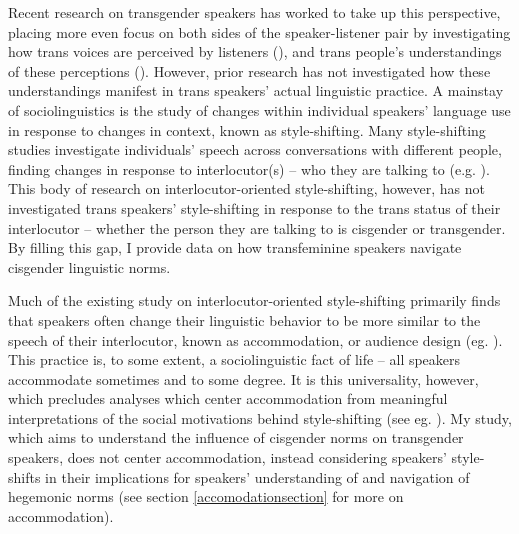 \documentclass[12pt,twoside]{reedthesis}
\begin{document}
Recent research on transgender speakers has worked to take up this perspective, placing more even focus on both sides of the speaker-listener pair by investigating how trans voices are perceived by listeners (\cite{jessee_cisgender_2025}), and trans people's understandings of these perceptions (\cite{heffernan_constructing_2023}). However, prior research has not investigated how these understandings manifest in trans speakers' actual linguistic practice. A mainstay of sociolinguistics is the study of changes within individual speakers' language use in response to changes in context, known as style-shifting. Many style-shifting studies investigate individuals' speech across conversations with different people, finding changes in response to interlocutor(s) -- who they are talking to (e.g. \cite{podesva_phonation_2007, rickford_addressee_1994}). This body of research on interlocutor-oriented style-shifting, however, has not investigated trans speakers' style-shifting in response to the trans status of their interlocutor -- whether the person they are talking to is cisgender or transgender. By filling this gap, I provide data on how transfeminine speakers navigate cisgender linguistic norms.

Much of the existing study on interlocutor-oriented style-shifting primarily finds that speakers often change their linguistic behavior to be more similar to the speech of their interlocutor, known as accommodation, or audience design (eg. \cite{rickford_addressee_1994}). This practice is, to some extent, a sociolinguistic fact of life -- all speakers accommodate sometimes and to some degree. It is this universality, however, which precludes analyses which center accommodation from meaningful interpretations of the social motivations behind style-shifting (see eg. \cite{podesva_phonation_2007, rickford_addressee_1994}). My study, which aims to understand the influence of cisgender norms on transgender speakers, does not center accommodation, instead considering speakers' style-shifts in their implications for speakers' understanding of and navigation of hegemonic norms (see section \ref{accomodationsection} for more on accommodation).
\end{document}

